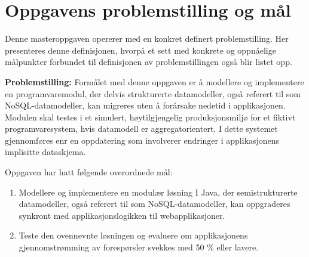 \section{Oppgavens problemstilling og mål} \label{goals}

Denne masteroppgaven opererer med en konkret definert problemstilling. Her presenteres denne definisjonen, hvorpå et sett med konkrete og oppnåelige målpunkter forbundet til definisjonen av problemstillingen også blir listet opp.

\textbf{Problemstilling:} Formålet med denne oppgaven er å modellere og implementere en programvaremodul, der delvis strukturerte datamodeller, også referert til som NoSQL-datamodeller, kan migreres uten å forårsake nedetid i applikasjonen. Modulen skal testes i et simulert, høytilgjengelig produksjonsmiljø for et fiktivt programvaresystem, hvis datamodell er aggregatorientert. I dette systemet gjennomføres enr en oppdatering som involverer endringer i applikasjonens implisitte dataskjema.

Oppgaven har hatt følgende overordnede mål:

\begin{enumerate}
  \item Modellere og implementere en modulær løsning I Java, der semistrukturerte datamodeller, også referert til som NoSQL-datamodeller, kan oppgraderes synkront med applikasjonslogikken til webapplikasjoner.
  \item Teste den ovennevnte løsningen og evaluere om applikasjonens gjennomstrømming av forespørsler svekkes med 50 \% eller lavere.
\end{enumerate}
